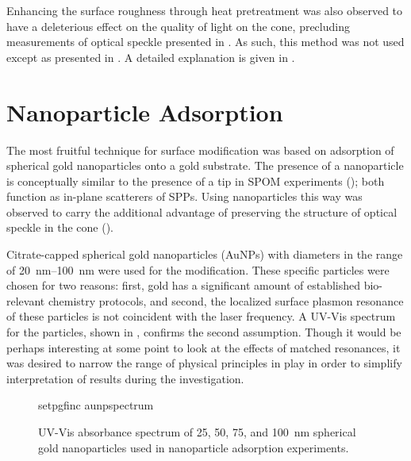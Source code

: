 Enhancing the surface roughness through heat pretreatment was also observed to
have a deleterious effect on the quality of light on the cone, precluding
measurements of optical speckle presented in .  As such,
this method was not used except as presented in .  A
detailed explanation is given in .

\section{Nanoparticle Adsorption}
The most fruitful technique for surface modification was based on adsorption
of spherical gold nanoparticles onto a gold substrate.  The presence of a
nanoparticle is conceptually similar to the presence of a tip in SPOM
experiments (); both function as in-plane scatterers of
SPPs.  Using nanoparticles this way was observed to carry the additional
advantage of preserving the structure of optical speckle in the cone
().

Citrate-capped spherical gold nanoparticles (AuNPs) with diameters in the
range of \SIrange{20}{100}{\nano\meter} were used for the modification.  These
specific particles were chosen for two reasons: first, gold has a significant
amount of established bio-relevant chemistry protocols, and second, the
localized surface plasmon resonance of these particles is not coincident with
the laser frequency.  A UV-Vis spectrum for the particles, shown in
, confirms the second assumption.  Though it would be
perhaps interesting at some point to look at the effects of matched
resonances, it was desired to narrow the range of physical principles in play
in order to simplify interpretation of results during the investigation.

\begin{figure}[ht]
\centering
{setpgfinc}
{aunpspectrum}
\caption{UV-Vis absorbance spectrum of 25, 50, 75, and \SI{100}{\nano\meter} spherical gold
nanoparticles used in nanoparticle adsorption experiments.}
\label{fig:aunpspectrum}
\end{figure}

